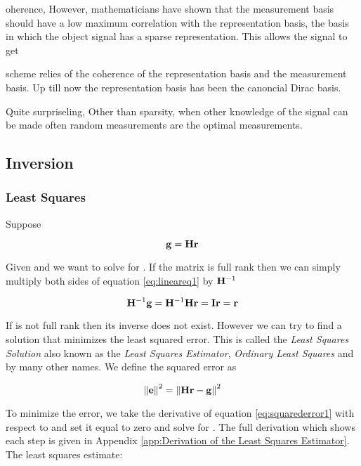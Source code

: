 oherence,  However, mathematicians have shown that the measurement basis should have a low maximum correlation with the representation basis, the basis in which the object signal has a sparse representation. This allows the signal to get 


scheme relies of the coherence of the representation basis and the measurement basis. Up till now the representation basis has been the canoncial Dirac basis. 

Quite surpriseling, Other than sparsity, when other knowledge of the signal can be made often random measurements are the optimal measurements. 



\subsection{Inversion}

\subsubsection{Least Squares}

Suppose 

\begin{equation}\label{eq:lineareq1}
	\mathbf{g} = \mathbf{Hr} 
\end{equation}

Given  and  we want to solve for . If the matrix is full rank then we can simply multiply both sides of equation \ref{eq:lineareq1} by $\mathbf{H}^{-1}$ 

\begin{equation}
	\mathbf{H}^{-1} \mathbf{g} = \mathbf{H}^{-1} \mathbf{Hr} = \mathbf{I} \mathbf{r} = \mathbf{r}
\end{equation}

If  is not full rank then its inverse does not exist. However we can try to find a solution  that minimizes the least squared error. This is called the \emph{Least Squares Solution} also known as the \emph{Least Squares Estimator}, \emph{Ordinary Least Squares} and by many other names. We define the squared error as

\begin{equation}\label{eq:squarederror1}
	\mathbf{ \lVert \mathbf{e} \rVert }^2 =    \mathbf{ \lVert \mathbf{Hr-g} \rVert }^2
\end{equation}

\noindent To minimize the error, we take the derivative of equation \ref{eq:squarederror1} with respect to  and set it equal to zero and solve for . The full derivation which shows each step is given in Appendix \ref{app:Derivation of the Least Squares Estimator}. The least squares estimate:

